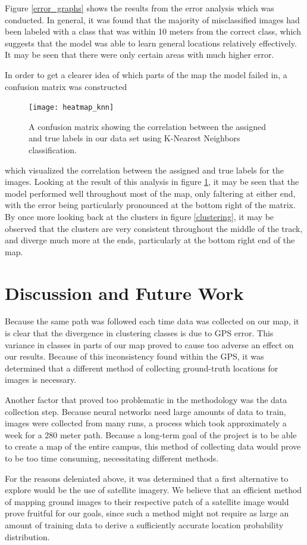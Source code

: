 \documentclass[letterpaper, 12 pt, conference]{ieeeconf}  %
\begin{document}
Figure \ref{error_graphs} shows the results from the error analysis which was conducted. In general, it was found that the majority of misclassified images had been labeled with a class that was within 10 meters from the correct class, which suggests that the model was able to learn general locations relatively effectively. It may be seen that there were only certain areas with much higher error. 
\par
In order to get a clearer idea of which parts of the map the model failed in, a confusion matrix was constructed
\begin{figure}[h]
\centering
\texttt{[image: heatmap\_knn]}
\caption{A confusion matrix showing the correlation between the assigned and true labels in our data set using K-Nearest Neighbors classification.}
\label{confusion_matrix}
\end{figure}
which visualized the correlation between the assigned and true labels for the images. Looking at the result of this analysis in figure \ref{confusion_matrix}, it may be seen that the model performed well throughout most of the map, only faltering at either end, with the error being particularly pronounced at the bottom right of the matrix. By once more looking back at the clusters in figure \ref{clustering}, it may be observed that the clusters are very consistent throughout the middle of the track, and diverge much more at the ends, particularly at the bottom right end of the map. 

\section{Discussion and Future Work}

Because the same path was followed each time data was collected on our map, it is clear that the divergence in clustering classes is due to GPS error. This variance in classes in parts of our map proved to cause too adverse an effect on our results. Because of this inconsistency found within the GPS, it was determined that a different method of collecting ground-truth locations for images is necessary. 
\par
Another factor that proved too problematic in the methodology was the data collection step. Because neural networks need large amounts of data to train, images were collected from many runs, a process which took approximately a week for a 280 meter path. Because a long-term goal of the project is to be able to create a map of the entire campus, this method of collecting data would prove to be too time consuming, necessitating different methods. 
\par
For the reasons deleniated above, it was determined that a first alternative to explore would be the use of satellite imagery. We believe that an efficient method of mapping ground images to their respective patch of a satellite image would prove fruitful for our goals, since such a method might not require as large an amount of training data to derive a sufficiently accurate location probability distribution.  
\end{document}
